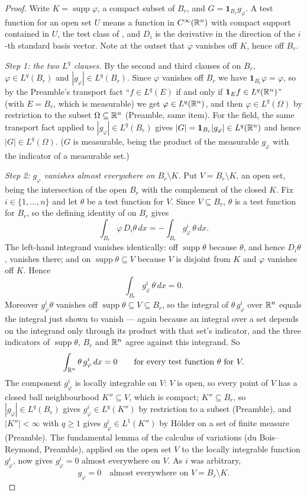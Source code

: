 \begin{proof}
Write $K=\operatorname{supp}\varphi$, a compact subset of $B_r$, and
$G=\mathbf1_{B_r}g_\varphi$.  A test function for an open set $U$ means a
function in $C^\infty(\mathbb{R}^n)$ with compact support contained in $U$, the test
class of , and $D_i$ is the derivative in the
direction of the $i$-th standard basis vector.  Note at the outset that
$\varphi$ vanishes off $K$, hence off $B_r$.

\emph{Step 1: the two $L^q$ clauses.}  By the second and third clauses of
 on $B_r$, $\varphi\in L^q(B_r)$ and
$|g_\varphi|\in L^q(B_r)$.  Since $\varphi$ vanishes off $B_r$ we have
$\mathbf1_{B_r}\varphi=\varphi$, so by the Preamble's transport fact
``$f\in L^q(E)$ if and only if $\mathbf1_Ef\in L^q(\mathbb{R}^n)$'' (with
$E=B_r$, which is measurable) we get $\varphi\in L^q(\mathbb{R}^n)$, and then
$\varphi\in L^q(\Omega)$ by restriction to the subset $\Omega\subseteq\mathbb{R}^n$
(Preamble, same item).  For the field, the same transport fact applied to
$|g_\varphi|\in L^q(B_r)$ gives $|G|=\mathbf1_{B_r}|g_\varphi|\in L^q(\mathbb{R}^n)$ and
hence $|G|\in L^q(\Omega)$.  ($G$ is measurable, being the product of the
measurable $g_\varphi$ with the indicator of a measurable set.)

\emph{Step 2: $g_\varphi$ vanishes almost everywhere on $B_r\setminus K$.}  Put
$V=B_r\setminus K$, an open set, being the intersection of the open $B_r$ with
the complement of the closed $K$.  Fix $i\in\{1,\dots,n\}$ and let $\theta$ be a
test function for $V$.  Since $V\subseteq B_r$, $\theta$ is a test function for
$B_r$, so the defining identity of  on $B_r$ gives
\[
\int_{B_r}\varphi\,D_i\theta\,dx=-\int_{B_r}g_\varphi^i\,\theta\,dx .
\]
The left-hand integrand vanishes identically: off $\operatorname{supp}\theta$
because $\theta$, and hence $D_i\theta$, vanishes there; and on
$\operatorname{supp}\theta\subseteq V$ because $V$ is disjoint from $K$ and
$\varphi$ vanishes off $K$.  Hence
\[
\int_{B_r}g_\varphi^i\,\theta\,dx=0 .
\]
Moreover $g_\varphi^i\theta$ vanishes off
$\operatorname{supp}\theta\subseteq V\subseteq B_r$, so the integral of
$\theta\,g_\varphi^i$ over $\mathbb{R}^n$ equals the integral just shown to vanish ---
again because an integral over a set depends on the integrand only through its
product with that set's indicator, and the three indicators of
$\operatorname{supp}\theta$, $B_r$ and $\mathbb{R}^n$ agree against this integrand.  So
\[
\int_{\mathbb{R}^n}\theta\,g_\varphi^i\,dx=0
\qquad\text{for every test function }\theta\text{ for }V .
\]
The component $g_\varphi^i$ is locally integrable on $V$: $V$ is open, so every
point of $V$ has a closed ball neighbourhood $K''\subseteq V$, which is compact;
$K''\subseteq B_r$, so $|g_\varphi|\in L^q(B_r)$ gives $g_\varphi^i\in L^q(K'')$
by restriction to a subset (Preamble), and $|K''|<\infty$ with $q\ge1$ gives
$g_\varphi^i\in L^1(K'')$ by H\"older on a set of finite measure (Preamble).
The fundamental lemma of the calculus of variations (du Bois--Reymond,
Preamble), applied on the open set $V$ to the locally integrable function
$g_\varphi^i$, now gives $g_\varphi^i=0$ almost everywhere on $V$.  As $i$ was
arbitrary,
\[
g_\varphi=0\quad\text{almost everywhere on }V=B_r\setminus K .
\tag{1}
\]


\end{proof}
